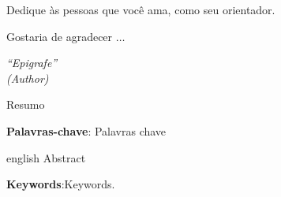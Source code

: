\documentclass[12pt,a4paper,oneside]{abntex2}
\numberwithin{equation}{section}
\numberwithin{figure}{section}
\begin{document}
	
	\begin{dedicatoria}
		\vspace*{\fill}
		Dedique às pessoas que você ama, como seu orientador.
		\vspace*{\fill}
	\end{dedicatoria}
	
	\begin{agradecimentos}
		Gostaria de agradecer $\dots$
	\end{agradecimentos}

	\begin{epigrafe}
	\vspace*{\fill}
	\begin{flushright}
		\textit{``Epigrafe'' \\ (Author)}
	\end{flushright}
	\end{epigrafe}



	\begin{resumo}
		Resumo

		\vspace{\onelineskip} 
		\noindent \textbf{Palavras-chave}: Palavras chave
	\end{resumo}

\begin{resumo}[Abstract] 
	\begin{otherlanguage*}{english}
		Abstract
		
		\vspace{\onelineskip} 
		\noindent \textbf{Keywords}:Keywords.
	\end{otherlanguage*} 
\end{resumo}

\end{document}

